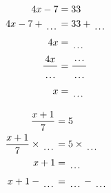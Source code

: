 \documentclass[12pt]{article}
\newcounter{minipagecount}
\begin{document}
\begin{multicols}{2}
\begin{minipage}[t]{0.45\textwidth}
    \raggedright %
    \begin{align*} %
        4x - 7 &= 33\\
        4x - 7 + \dotuline{\hspace{5mm}} &= 33 + \dotuline{\hspace{5mm}}\\
        4x &= \dotuline{\hspace{5mm}}\\
        \frac{4x}{\dotuline{\hspace{5mm}}} &= \frac{\dotuline{\hspace{5mm}}}{\dotuline{\hspace{5mm}}}\\
        x &= \dotuline{\hspace{5mm}}\\
    \end{align*}
\end{minipage}\columnbreak
\noindent{(\theminipagecount)}\hspace{0.1mm} %
\begin{minipage}[t]{0.45\textwidth} %
    \vspace{-26pt}  %
    \raggedright %
    \begin{align*} %
        \frac{x + 1}{7} &= 5\\
        \frac{x + 1}{7} \times\dotuline{\hspace{5mm}} &= 5 \times\dotuline{\hspace{5mm}}\\
        x + 1 &= \dotuline{\hspace{5mm}}\\
        x + 1 - \dotuline{\hspace{5mm}} &= \dotuline{\hspace{5mm}} - \dotuline{\hspace{5mm}}\\

\end{align*}
\end{minipage}
\end{multicols}
\end{document}
